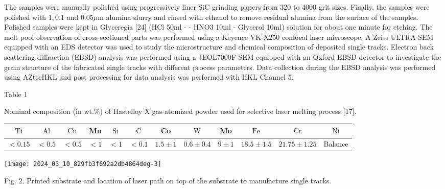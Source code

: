\documentclass[10pt]{article}
\begin{document}
The samples were manually polished using progressively finer SiC grinding papers from 320 to 4000 grit sizes. Finally, the samples were polished with $1,0.1$ and $0.05 \mu \mathrm{m}$ alumina slurry and rinsed with ethanol to remove residual alumina from the surface of the samples. Polished samples were kept in Glyceregia [24] (HCl 50ml - - HNO3 10ml - Glycerol 10ml) solution for about one minute for etching. The melt pool observation of cross-sectioned parts was performed using a Keyence VK-X250 confocal laser microscope. A Zeiss ULTRA SEM equipped with an EDS detector was used to study the microstructure and chemical composition of deposited single tracks. Electron back scattering diffraction (EBSD) analysis was performed using a JEOL7000F SEM equipped with an Oxford EBSD detector to investigate the grain structure of the fabricated single tracks with different process parameters. Data collection during the EBSD analysis was performed using AZtecHKL and post processing for data analysis was performed with HKL Channel 5.

Table 1

Nominal composition (in wt.\%) of Hastelloy X gas-atomized powder used for selective laser melting process [17].

\begin{center}
\begin{tabular}{|c|c|c|c|c|c|c|c|c|c|c|c|}
\hline
$\mathrm{Ti}$ & $\mathrm{Al}$ & $\mathrm{Cu}$ & Mn & $\mathrm{Si}$ & $\mathrm{C}$ & Co & $\mathrm{W}$ & Mo & $\mathrm{Fe}$ & $\mathrm{Cr}$ & $\mathrm{Ni}$ \\
\hline
$<0.15$ & $<0.5$ & $<0.5$ & $<1$ & $<1$ & $<0.1$ & $1.5 \pm 1$ & $0.6 \pm 0.4$ & $9 \pm 1$ & $18.5 \pm 1.5$ & $21.75 \pm 1.25$ & Balance \\
\hline
\end{tabular}
\end{center}

\begin{center}
\texttt{[image: 2024\_03\_10\_829fb3f692a2db4864deg-3]}
\end{center}

Fig. 2. Printed substrate and location of laser path on top of the substrate to manufacture single tracks.
\end{document}
